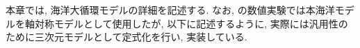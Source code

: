 \label{ocn_model}
本章では, 海洋大循環モデルの詳細を記述する. 
なお, \cite{ykawai2018_Dthesis}の数値実験では本海洋モデルを軸対称モデルとして使用したが, 
以下に記述するように, 実際には汎用性のために三次元モデルとして定式化を行い, 実装している. 









